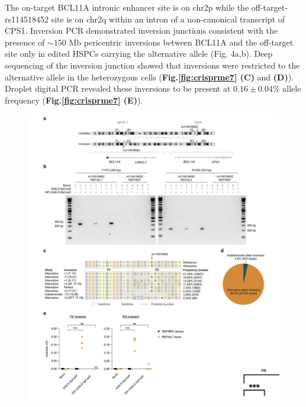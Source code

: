 \documentclass[a4paper, titlepage, openright]{book}
\begin{document}
The on-target BCL11A intronic enhancer site is on chr2p while the off-target-rs114518452 site is on chr2q within an intron of a non-canonical transcript of CPS1. Inversion PCR demonstrated inversion junctions consistent with the presence of $\sim 150$ Mb pericentric inversions between BCL11A and the off-target site only in edited HSPCs carrying the alternative allele (Fig. 4a,b). Deep sequencing of the inversion junction showed that inversions were restricted to the alternative allele in the heterozygous cells (\textbf{Fig.\ref{fig:crisprme7} (C)} and \textbf{(D)}). Droplet digital PCR revealed these inversions to be present at $0.16 \pm 0.04\%$ allele frequency (\textbf{Fig.\ref{fig:crisprme7} (E)}). 
\begin{figure}
	\centering
	\includegraphics[width=\textwidth]{figures/crisprme7.png}

\end{figure}
\end{document}

